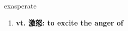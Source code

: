 
\begin{frame}
{\huge exasperate}
\begin{center}
\begin{enumerate}\Large
  \item \textbf{vt. 激怒: to excite the anger of}
\end{enumerate}
\end{center}
\end{frame}

